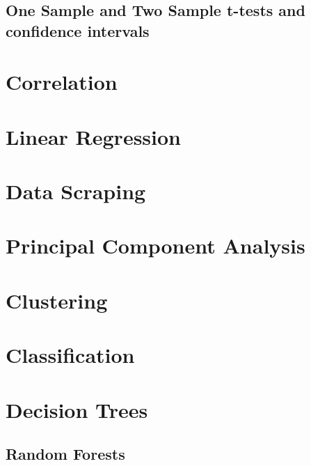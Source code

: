 \documentclass[
]{book}
\theoremstyle{definition}
\theoremstyle{definition}
\theoremstyle{definition}
\theoremstyle{definition}
\theoremstyle{remark}
\begin{document}
\hypertarget{one-sample-and-two-sample-t-tests-and-confidence-intervals}{%
\section{One Sample and Two Sample t-tests and confidence intervals}\label{one-sample-and-two-sample-t-tests-and-confidence-intervals}}

\hypertarget{correlation}{%
\chapter{Correlation}\label{correlation}}

\hypertarget{linear-regression}{%
\chapter{Linear Regression}\label{linear-regression}}

\hypertarget{data-scraping}{%
\chapter{Data Scraping}\label{data-scraping}}

\hypertarget{principal-component-analysis}{%
\chapter{Principal Component Analysis}\label{principal-component-analysis}}

\hypertarget{clustering}{%
\chapter{Clustering}\label{clustering}}

\hypertarget{classification}{%
\chapter{Classification}\label{classification}}

\hypertarget{decision-trees}{%
\chapter{Decision Trees}\label{decision-trees}}

\hypertarget{random-forests}{%
\section{Random Forests}\label{random-forests}}
\end{document}
